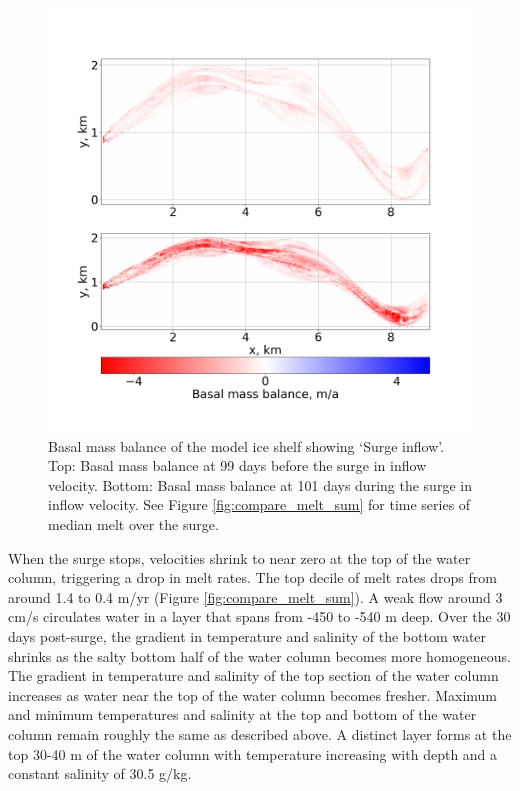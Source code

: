\begin{figure}[!ht]
\centering
\includegraphics[width=1\textwidth]{chapters/4/surge_melt.png}
\caption[Surge inflow (melt)]{Basal mass balance of the model ice shelf showing `Surge inflow'. Top: Basal mass balance at 99 days before the surge in inflow velocity. Bottom: Basal mass balance at 101 days during the surge in inflow velocity. See Figure \ref{fig:compare_melt_sum} for time series of median melt over the surge.}
\label{fig:surge_melt}
\end{figure}

When the surge stops, velocities shrink to near zero at the top of the water column, triggering a drop in melt rates. The top decile of melt rates drops from around 1.4 to 0.4 m/yr (Figure \ref{fig:compare_melt_sum}). A weak flow around 3 cm/s circulates water in a layer that spans from -450 to -540 m deep. Over the 30 days post-surge, the gradient in temperature and salinity of the bottom water shrinks as the salty bottom half of the water column becomes more homogeneous. The gradient in temperature and salinity of the top section of the water column increases as water near the top of the water column becomes fresher. Maximum and minimum temperatures and salinity at the top and bottom of the water column remain roughly the same as described above. A distinct layer forms at the top 30-40 m of the water column with temperature increasing with depth and a constant salinity of 30.5 g/kg. 


